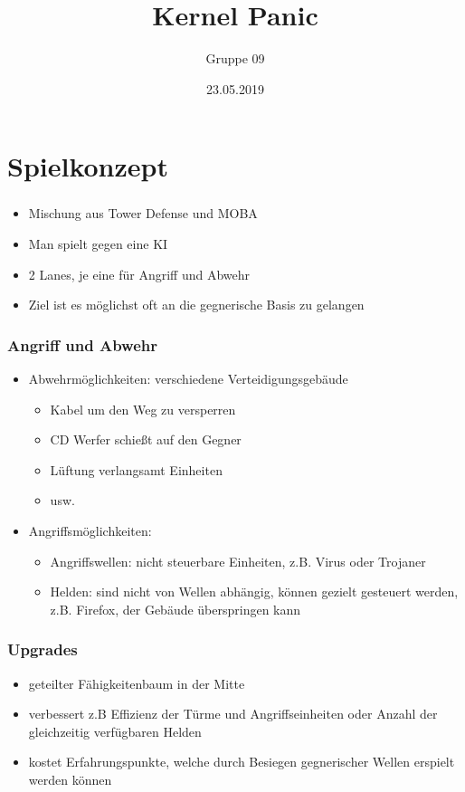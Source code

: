 \documentclass{beamer}
\title{Kernel Panic}
\author{Gruppe 09}
\date{23.05.2019}
\begin{document}
{
\frame{}
}

\section[Outline]{}
\frame{\tableofcontents}

\section{Spielkonzept}
\begin{frame}
\frametitle{\secname}
\begin{itemize}
\item Mischung aus Tower Defense und MOBA
\item Man spielt gegen eine KI
\item 2 Lanes, je eine für Angriff und Abwehr
\item Ziel ist es möglichst oft an die gegnerische Basis zu gelangen
\end{itemize}
\end{frame}

\begin{frame}
\frametitle{Angriff und Abwehr}
\begin{itemize}
\item Abwehrmöglichkeiten:  verschiedene Verteidigungsgebäude
\begin{itemize}
\item Kabel um den Weg zu versperren
\item CD Werfer schießt auf den Gegner
\item Lüftung verlangsamt Einheiten
\item usw.
\end{itemize}
\item Angriffsmöglichkeiten:
\begin{itemize}
\item Angriffswellen: nicht steuerbare Einheiten, z.B. Virus oder Trojaner
\item Helden: sind nicht von Wellen abhängig, können gezielt gesteuert werden, z.B. Firefox, der Gebäude überspringen kann
\end{itemize}
\end{itemize}
\end{frame}

\begin{frame}
\frametitle{Upgrades}
\begin{itemize}
\item geteilter Fähigkeitenbaum in der Mitte
\item verbessert z.B Effizienz der Türme und Angriffseinheiten oder Anzahl der gleichzeitig verfügbaren Helden
\item kostet Erfahrungspunkte, welche durch Besiegen gegnerischer Wellen erspielt werden können
\end{itemize}
\end{frame}
\end{document}
